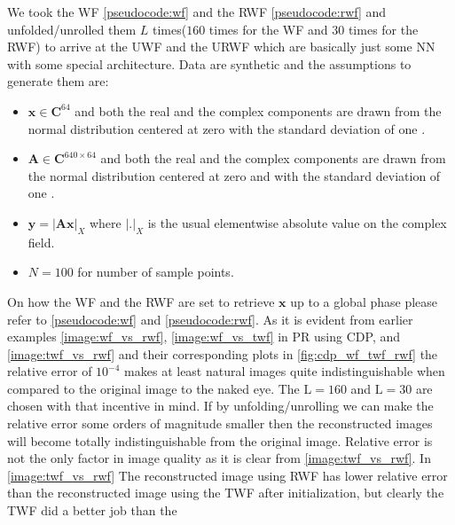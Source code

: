We took the \ac{WF}\cite{Candes2014} \cref{pseudocode:wf} and the \ac{RWF}\cite{Zhang2016} \cref{pseudocode:rwf} and unfolded/unrolled them $L$ times($160$ times for the \ac{WF} 
and $30$ times for the \ac{RWF}) to arrive at the \ac{UWF} and the \ac{URWF} which are basically just some \ac{NN}\cite{Goodfellow2016}\cite{Bishop2006} 
with some special architecture. Data are synthetic and the assumptions to generate them are:
\begin{itemize}
  \item $\boldsymbol{x} \in \boldsymbol{C}^{64}$ and both the real and the complex components are drawn from the normal distribution 
  centered at zero with the standard deviation of one \cite{Candes2014}\cite{Zhang2016}.
  \item $\boldsymbol{A} \in \boldsymbol{C}^{640 \times 64}$ and both the real and the complex components are drawn from the normal distribution 
  centered at zero and with the standard deviation of one \cite{Candes2014}\cite{Zhang2016}.
  \item $\boldsymbol{y}= \left|\boldsymbol{A}\boldsymbol{x}\right|_{X}$ where $\left|\boldsymbol{.}\right|_X$ is the usual elementwise absolute value on the complex field.
  \item $N=100$ for number of sample points. 
\end{itemize}
On how the \ac{WF}\cite{Candes2014} and the \ac{RWF}\cite{Zhang2016} are set to retrieve $\boldsymbol{x}$ up to a global phase please refer to \cref{pseudocode:wf}\cite{Candes2014} and \cref{pseudocode:rwf}\cite{Zhang2016}. 
As it is evident from earlier examples \cref{image:wf_vs_rwf}, \ref{image:wf_vs_twf} in \ac{PR} using \ac{CDP}, 
and \ref{image:twf_vs_rwf} and their corresponding plots in \cref{fig:cdp_wf_twf_rwf} the relative error of $10^{-4}$ 
makes at least natural images quite indistinguishable when compared to the original image to the naked eye. The 
$\mathrm{L}=160$ and $\mathrm{L}=30$ are chosen with that incentive in mind. If by unfolding/unrolling we can make 
the relative error some orders of magnitude smaller then the reconstructed images will become totally 
indistinguishable from the original image. Relative error is not the only factor in image quality as it is clear 
from \cref{image:twf_vs_rwf}. In \cref{image:twf_vs_rwf} The reconstructed image using \ac{RWF}\cite{Zhang2016} has lower relative error than the 
reconstructed image using the \ac{TWF}\cite{Chen2015} after initialization, but clearly the \ac{TWF}\cite{Chen2015} did a better job than the 
